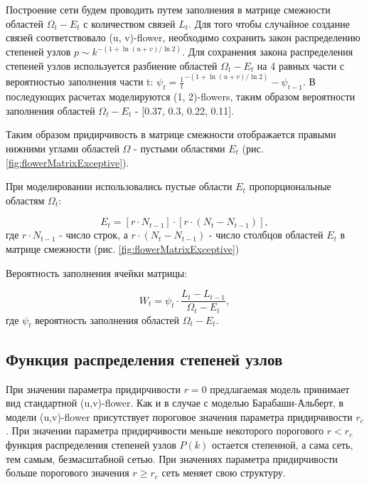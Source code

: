\documentclass[10pt,aps,pra]{revtex4-1}
\begin{document}
        Построение сети будем проводить путем заполнения в матрице смежности областей $\Omega_t - E_t$ с количеством связей $L_t$. Для того чтобы случайное создание связей соответствовало (u, v)-flower, необходимо сохранить закон распределению степеней узлов $p \sim k^{-(1+\ln(u+v)/\ln{2})}$\cite{Rozenfeld2}. Для сохранения закона распределения степеней узлов используется разбиение областей $\Omega_t-E_t$ на 4 равных части с вероятностью заполнения части t: $\psi_t =  \frac{1}{t}^{-(1+\ln(u+v)/\ln{2})} - \psi_{t-1}$. В последующих расчетах моделируются (1, 2)-flowers, таким образом вероятности заполнения областей $\Omega_t-E_t$ - [0.37, 0.3, 0.22, 0.11].


        Таким образом придирчивость в матрице смежности отображается правыми нижними углами областей $\Omega$ - пустыми областями $E_t$ (рис. \ref{fig:flowerMatrixExceptive}). 
        
        При моделировании использовались пустые области $E_t$ пропорциональные областям $\Omega_t$:

            \begin{equation}
                E_t= [r \cdot N_{t-1}] \cdot [r \cdot (N_t - N_{t-1})],
            \end{equation}
                где $r \cdot N_{t-1}$ - число строк, а $r \cdot (N_t - N_{t-1})$ - число столбцов областей $E_t$ в матрице смежности (рис. \ref{fig:flowerMatrixExceptive})

        Вероятность заполнения ячейки матрицы:
        
            \begin{equation}
                W_t=\psi_t \cdot \frac{L_t-L_{t-1}}{\Omega_t-E_t},
            \end{equation}
                где $\psi_t$ вероятность заполнения областей $\Omega_t - E_t$.

    \subsection{Функция распределения степеней узлов}

        При значении параметра придирчивости $r=0$ предлагаемая модель принимает вид стандартной (u,v)-flower. Как и в случае с моделью Барабаши-Альберт, в модели (u,v)-flower присутствует пороговое значения параметра придирчивости $r_c$. При значении параметра придирчивости меньше некоторого порогового $r<r_c$ функция распределения степеней узлов $P(k)$ остается степенной, а сама сеть, тем самым, безмасштабной сетью. При значениях параметра придирчивости больше порогового значения $r \geq r_c$ сеть меняет свою структуру. 
\end{document}
